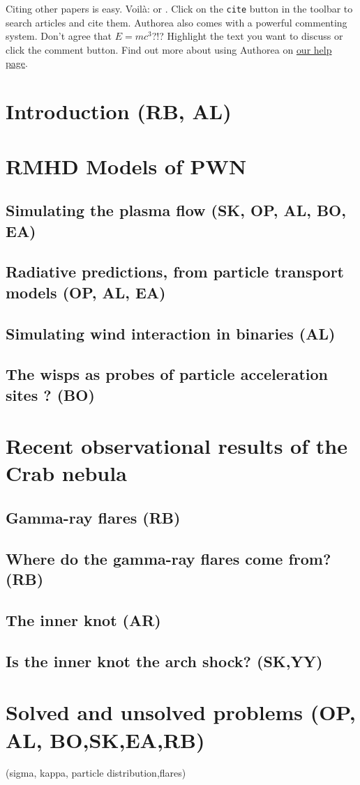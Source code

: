 Citing other papers is easy. Voilà: \cite{2012} or \cite{Holstein_2009}. Click on the \verb|cite| button in the toolbar to search articles and cite them. Authorea also comes with a powerful commenting system. Don't agree that $E  =  mc^{3}$?!? Highlight the text you want to discuss or click the comment button. Find out more about using Authorea on \href{https://www.authorea.com/help}{our help page}.

\section{Introduction (RB, AL)}

\section{RMHD Models of PWN}
\subsection{Simulating the plasma flow         (SK, OP, AL, BO, EA)}
\subsection{Radiative predictions, from particle transport models      (OP, AL, EA)}
\subsection{Simulating wind interaction in binaries             (AL)}
\subsection{The wisps as probes of  particle acceleration sites ? (BO)}

\section{Recent observational results of the Crab nebula}
\subsection{Gamma-ray flares (RB)}
\subsection{Where do the gamma-ray flares come from?                  (RB)}
\subsection{The inner knot   (AR)}
\subsection{Is the inner knot the arch shock?                                      (SK,YY)}

\section{Solved and unsolved problems      (OP, AL, BO,SK,EA,RB)}
(sigma, kappa, particle distribution,flares)